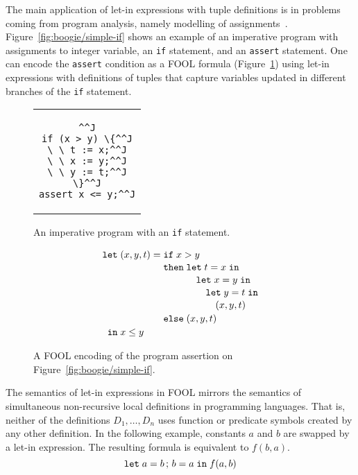 \documentclass{easychair}
\begin{document}
The main application of let-in expressions with tuple definitions is in problems
coming from program analysis, namely modelling of assignments~\cite{KKV18}.
Figure~\ref{fig:boogie/simple-if} shows an example of an imperative program
with assignments to integer variable, an \texttt{if} statement, and an
\texttt{assert} statement. One can encode the \texttt{assert} condition as a
FOOL formula (Figure~\ref{fig:boogie/simple-if-fool}) using let-in expressions
with definitions of tuples that capture variables updated in different branches
of the \texttt{if} statement.
\begin{figure}
  \quad\qquad\qquad
  \parbox{4.5cm}{
    \vspace{1em}
    \begin{center}
    \begin{tabular}{c}
    \begin{lstlisting}^^J
if (x > y) \{^^J
\ \ t := x;^^J
\ \ x := y;^^J
\ \ y := t;^^J
\}^^J
assert x <= y;^^J
    \end{lstlisting}
    \end{tabular}
    \end{center}
    \vspace{1em}
    \caption{An imperative program with an \texttt{if} statement.}
    \label{fig:boogie/simple-if}
  }
\qquad
  \begin{minipage}{6cm}
\[
  \letnl{(x,y,t)}{\itenll{x > y}
                 {\letinnl{t}{x}
                          {\letinnl{x}{y}
                                   {\letinnl{y}{t}
                                            {(x,y,t)}}}}
                 {(x,y,t)}}
        {x \le y}
\]
    \caption{A FOOL encoding of the program assertion on
    Figure~\ref{fig:boogie/simple-if}.}
    \label{fig:boogie/simple-if-fool}
  \end{minipage}
\vspace{-1.5em}
\end{figure}

The semantics of let-in expressions in FOOL mirrors the semantics of
simultaneous non-recursive local definitions in programming languages. That is,
neither of the definitions $D_1,\ldots,\allowbreak D_n$ uses function or
predicate symbols created by any other definition. In the following example,
constants $a$ and $b$ are swapped by a let-in expression. The resulting formula
is equivalent to $f(b, a)$.
\begin{equation}\label{eq:parallel-let-example}
\mathtt{let}\;{a}={b}\,;\,{b}={a}\;\mathtt{in}\;f(a, b)
\end{equation}
\end{document}
